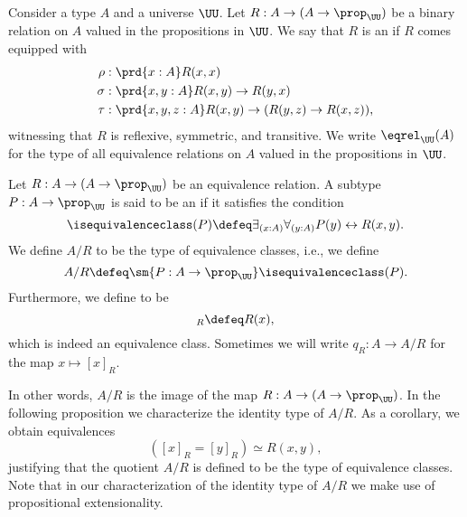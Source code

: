 \begin{defn}\label{defn:eq_rel}
Consider a type $A$ and a universe $\UU$. Let $R:A\to (A\to\prop_\UU)$ be a binary relation on $A$ valued in the propositions in $\UU$. We say that $R$ is an  if $R$ comes equipped with
\begin{align*}
\rho & : \prd{x:A}R(x,x) \\*
\sigma & : \prd{x,y:A} R(x,y)\to R(y,x) \\*
\tau & : \prd{x,y,z:A} R(x,y)\to (R(y,z)\to R(x,z)),
\end{align*}
witnessing that $R$ is reflexive, symmetric, and transitive. We write $\eqrel_\UU(A)$ for the type of all equivalence relations on $A$ valued in the propositions in $\UU$.
\end{defn}

\begin{defn}
  Let $R:A\to (A\to\prop_\UU)$ be an equivalence relation. A subtype $P:A\to \prop_\UU$ is said to be an  if it satisfies the condition
  \begin{equation*}
    \isequivalenceclass(P)\defeq\exists_{(x:A)}\forall_{(y:A)}P(y)\leftrightarrow R(x,y).
  \end{equation*}
  We define $A/R$ to be the type of equivalence classes, i.e., we define
  \begin{equation*}
    A/R\defeq \sm{P:A\to\prop_\UU}\isequivalenceclass(P).
  \end{equation*}
  Furthermore, we define  to be
  \begin{equation*}
    [x]_R\defeq R(x),
  \end{equation*}
  which is indeed an equivalence class. Sometimes we will write $q_R:A\to A/R$ for the map $x\mapsto [x]_R$.
\end{defn}

In other words, $A/R$ is the image of the map $R:A\to (A\to\prop_\UU)$. In the following proposition we characterize the identity type of $A/R$. As a corollary, we obtain equivalences
\begin{equation*}
  ([x]_R=[y]_R)\simeq R(x,y),
\end{equation*}
justifying that the quotient $A/R$ is defined to be the type of equivalence classes. Note that in our characterization of the identity type of $A/R$ we make use of propositional extensionality.

